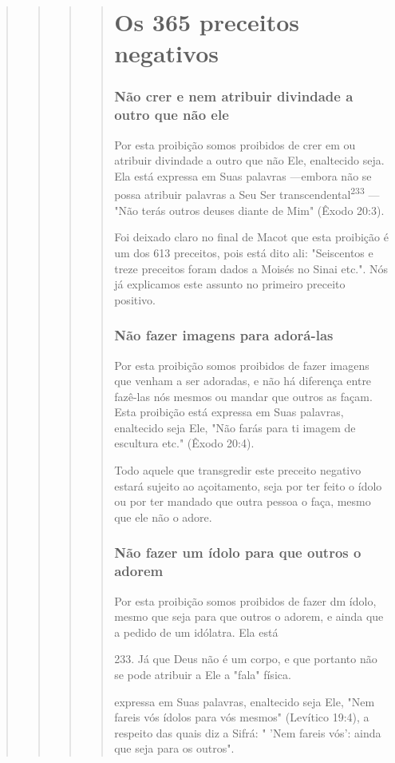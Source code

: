 \begin{quote}
\begin{quote}
\begin{quote}
\begin{quote}
\part{Os 365 preceitos negativos}



\section{Não crer e nem atribuir divindade a outro que não ele}

Por esta proibição somos proibidos de crer em ou atribuir divinda­de a
outro que não Ele, enaltecido seja. Ela está expressa em Suas palavras
---embora não se possa atribuir palavras a Seu Ser
transcendental\textsuperscript{233} --- "Não te­rás outros deuses diante
de Mim" (Êxodo 20:3).

Foi deixado claro no final de Macot que esta proibição é um dos 613
preceitos, pois está dito ali: "Seiscentos e treze preceitos foram dados
a Moisés no Sinai etc.". Nós já explicamos este assunto no primeiro
preceito positivo.

\section{Não fazer imagens para adorá-las}

Por esta proibição somos proibidos de fazer imagens que venham a ser
adoradas, e não há diferença entre fazê-las nós mesmos ou mandar que
outros as façam. Esta proibição está expressa em Suas palavras,
enaltecido seja Ele, "Não farás para ti imagem de escultura etc." (Êxodo
20:4).

Todo aquele que transgredir este preceito negativo estará sujeito ao
açoitamento, seja por ter feito o ídolo ou por ter mandado que outra
pessoa o faça, mesmo que ele não o adore.

\section{Não fazer um ídolo para que outros o adorem}

Por esta proibição somos proibidos de fazer dm ídolo, mesmo que seja
para que outros o adorem, e ainda que a pedido de um idólatra. Ela está

233. Já que Deus não é um corpo, e que portanto não se pode atribuir a
Ele a "fala" física.

expressa em Suas palavras, enaltecido seja Ele, "Nem fareis vós ídolos
para vós mesmos" (Levítico 19:4), a respeito das quais diz a Sifrá: "
'Nem fareis vós': ainda que seja para os outros".


\end{quote}
\end{quote}
\end{quote}
\end{quote}
